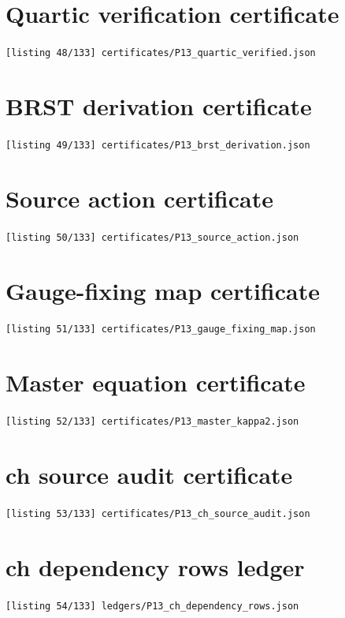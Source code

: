 \section{Quartic verification certificate}
\noindent\texttt{[listing 48/133] certificates/P13\_quartic\_verified.json}
{\scriptsize}

\section{BRST derivation certificate}
\noindent\texttt{[listing 49/133] certificates/P13\_brst\_derivation.json}
{\scriptsize}

\section{Source action certificate}
\noindent\texttt{[listing 50/133] certificates/P13\_source\_action.json}
{\scriptsize}

\section{Gauge-fixing map certificate}
\noindent\texttt{[listing 51/133] certificates/P13\_gauge\_fixing\_map.json}
{\scriptsize}

\section{Master equation certificate}
\noindent\texttt{[listing 52/133] certificates/P13\_master\_kappa2.json}
{\scriptsize}

\section{ch source audit certificate}
\noindent\texttt{[listing 53/133] certificates/P13\_ch\_source\_audit.json}
{\scriptsize}

\section{ch dependency rows ledger}
\noindent\texttt{[listing 54/133] ledgers/P13\_ch\_dependency\_rows.json}
{\scriptsize}

